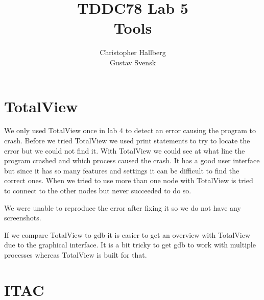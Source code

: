 \documentclass[a4paper, 12pt]{article}
\begin{document}
\title{TDDC78 Lab 5\\
        Tools }
\author{Christopher Hallberg \\
        Gustav Svensk}
\maketitle

\thispagestyle{empty}

\newpage
\setcounter{page}{1}
\tableofcontents
\newpage

\section{TotalView}
We only used TotalView once in lab 4 to detect an error causing the program to
crash. Before we tried TotalView we used print statements to try to locate the
error but we could not find it. With TotalView we could see at what line the
program crashed and which process caused the crash. It has a good user interface
but since it has so many features and settings it can be difficult to find the
correct ones. When we tried to use more than one node with TotalView is tried to
connect to the other nodes but never succeeded to do so.

We were unable to reproduce the error after fixing it so we do not have any
screenshots.

If we compare TotalView to gdb it is easier to get an overview with TotalView
due to the graphical interface. It is a bit tricky to get gdb to work with
multiple processes whereas TotalView is built for that.

\section{ITAC}
\end{document}
